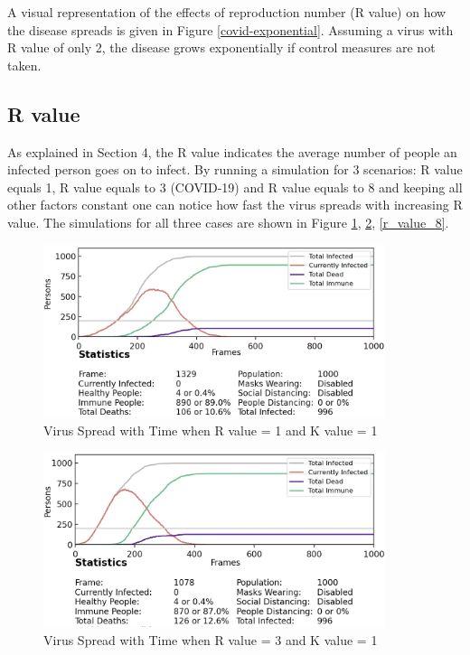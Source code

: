 \documentclass[11pt]{article}
\begin{document}
A visual representation of the effects of reproduction number (R value) on how the disease spreads is given in Figure \ref{covid-exponential}. Assuming a virus with R value of only 2, the disease grows exponentially if control measures are not taken.

\subsection{R value} 
As explained in Section 4, the R value indicates the average number of people an infected person goes on to infect. By running a simulation for 3 scenarios: R value equals 1, R value equals to 3 (COVID-19) and R value equals to 8 and keeping all other factors constant one can notice how fast the virus spreads with increasing R value. The simulations for all three cases are shown in Figure \ref{r_value_1}, \ref{r_value_3}, \ref{r_value_8}.

\begin{figure}[H]
    \centering
    \includegraphics[width=10cm]{figures/r_value_comparison1.png}
    \caption{Virus Spread with Time when R value = 1 and K value = 1}
    \label{r_value_1}
\end{figure}

\begin{figure}[H]
    \centering
    \includegraphics[width=10cm]{figures/r_value_comparison3.png}
    \caption{Virus Spread with Time when R value = 3 and K value = 1}
    \label{r_value_3}
\end{figure}
\end{document}
